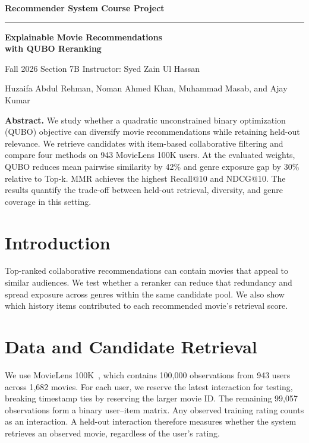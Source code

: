 \documentclass[10pt,a4paper]{article}
\begin{document}
{\small\bfseries\color{paperblue} Recommender System Course Project\par}
\vspace{3pt}
{\color{paperblue}\hrule}
\vspace{10pt}
{\LARGE\bfseries\color{paperblue} Explainable Movie Recommendations\\with QUBO Reranking\par}
\vspace{7pt}
{\small Fall 2026 \textbar{} Section 7B \textbar{} Instructor: Syed Zain Ul Hassan\par}
\vspace{4pt}
{\small
Huzaifa Abdul Rehman, Noman Ahmed Khan, Muhammad Masab, and Ajay Kumar\par}

\medskip
\textbf{Abstract.} We study whether a quadratic unconstrained binary optimization (QUBO) objective can diversify movie recommendations while retaining held-out relevance. We retrieve candidates with item-based collaborative filtering and compare four methods on 943 MovieLens 100K users. At the evaluated weights, QUBO reduces mean pairwise similarity by 42\% and genre exposure gap by 30\% relative to Top-k. MMR achieves the highest Recall@10 and NDCG@10. The results quantify the trade-off between held-out retrieval, diversity, and genre coverage in this setting.


\section{Introduction}
Top-ranked collaborative recommendations can contain movies that appeal to similar audiences. We test whether a reranker can reduce that redundancy and spread exposure across genres within the same candidate pool. We also show which history items contributed to each recommended movie's retrieval score.

\section{Data and Candidate Retrieval}
We use MovieLens 100K~\cite{movielens}, which contains 100,000 observations from 943 users across 1,682 movies. For each user, we reserve the latest interaction for testing, breaking timestamp ties by reserving the larger movie ID. The remaining 99,057 observations form a binary user--item matrix. Any observed training rating counts as an interaction. A held-out interaction therefore measures whether the system retrieves an observed movie, regardless of the user's rating.
\end{document}
